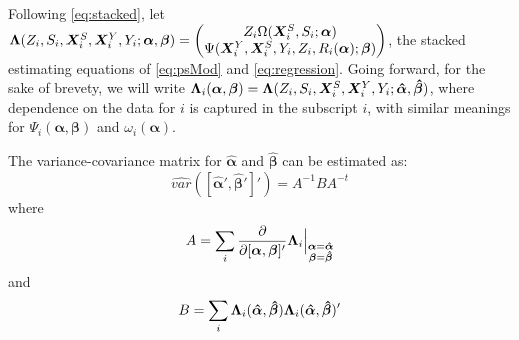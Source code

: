 \documentclass{statsoc} %
\begin{document}
\sloppy
Following \eqref{eq:stacked}, let $\bm{\Lambda}(Z_i,S_i,\bm{X}^S_i,\bm{X}^Y_i,Y_i;\bm{\alpha},\bm{\beta})=\begin{pmatrix} Z_i\Omega(\bm{X}^S_i,S_i;\bm{\alpha})\\ \Psi(\bm{X}^Y_i,\bm{X}^S_i,Y_i,Z_i,R_i(\bm{\alpha});\bm{\beta})\end{pmatrix}$, the stacked estimating equations of \eqref{eq:psMod} and \eqref{eq:regression}.
Going forward, for the sake of brevety, we will write $\bm{\Lambda}_i(\bm{\alpha},\bm{\beta})=\bm{\Lambda}(Z_i,S_i,\bm{X}^S_i,\bm{X}^Y_i,Y_i;\bm{\hat{\alpha}},\bm{\hat{\beta}})$, where dependence on the data for $i$ is captured in the subscript $i$, with similar meanings for $\Psi_i(\bm{\alpha},\bm{\beta})$ and $\omega_i(\bm{\alpha})$. 

The variance-covariance matrix for $\bm{\hat{\alpha}}$ and $\bm{\hat{\beta}}$ can be estimated as:
\begin{equation*}
  \widehat{var}\left([\bm{\hat{\alpha}}',\bm{\hat{\beta}}']'\right)=A^{-1}BA^{-t}
\end{equation*}
where
\begin{equation*}%
  A=\sum_i \frac{\partial}{\partial [\bm{\alpha},\bm{\beta}]'} \blam_i\Bigr|_{\substack{\bm{\alpha}=\bm{\hat{\alpha}}\\\bm{\beta}=\bm{\hat{\beta}}}}
\end{equation*}
and
\begin{equation*}%
  B=\sum_i \blam_i(\bm{\hat{\alpha}},\bm{\hat{\beta}})\blam_i(\bm{\hat{\alpha}},\bm{\hat{\beta}})'
\end{equation*}
\end{document}
